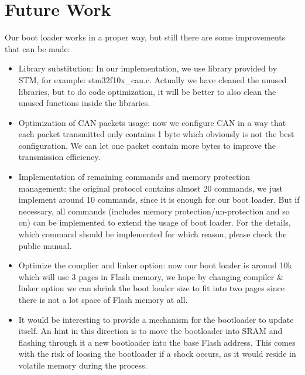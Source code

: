 \documentclass[11pt]{article} %
\begin{document}
\section{Future Work}
Our boot loader works in a proper way, but still there are some improvements that can be made:
\begin{itemize}
\item Library substitution: In our implementation, we use library provided by STM, for example: stm32f10x\_can.c. Actually we have cleaned the unused libraries, but to do code optimization, it will be better to also clean the unused functions inside the libraries.
\item Optimization of CAN packets usage: now we configure CAN in a way that each packet transmitted only contains 1 byte which obviously is not the best configuration. We can let one packet contain more bytes to improve the transmission efficiency.
\item Implementation of remaining commands and memory protection management: the original protocol contains almost 20 commands, we just implement around 10 commands, since it is enough for our boot loader. But if necessary, all commands (includes memory protection/un-protection and so on) can be implemented to extend the usage of boot loader. For the details, which command should be implemented for which reason, please check the public manual.
\item Optimize the complier and linker option: now our boot loader is around 10k which will use 3 pages in Flash memory, we hope by changing compiler \& linker option we can shrink the boot loader size to fit into two pages since there is not a lot space of Flash memory at all.
\item It would be interesting to provide a mechanism for the bootloader to update itself. An hint in this direction is to move the bootloader into SRAM and flashing through it a new bootloader into the base Flash address. This comes with the risk of loosing the bootloader if a  shock occurs, as it would reside in volatile memory during the process.
\end{itemize}
\end{document}

